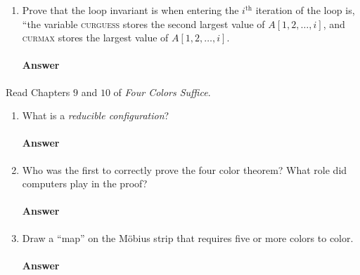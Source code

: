 \documentclass{article}
\begin{document}
\begin{enumerate}

    \item Prove that the loop invariant is when entering the $i^\text{th}$
        iteration of the loop is, ``the variable \textsc{curguess} stores
        the second
        largest value of $A[1,2, \ldots, i]$,
        and \textsc{curmax} stores the largest value of $A[1,2,\ldots, i]$.

        \paragraph{Answer}


\end{enumerate}



\collab{\todo{}} 

Read Chapters $9$ and $10$ of \emph{Four Colors Suffice}.

\begin{enumerate}

    \item What is a \emph{reducible configuration}?

        \paragraph{Answer}




    \item Who was the first to correctly prove the four color theorem?  What
        role did computers play in the proof?

        \paragraph{Answer}





    \item Draw a ``map'' on the M\"obius strip that requires five or more colors
        to color.

        \paragraph{Answer}



\end{enumerate}
\end{document}
